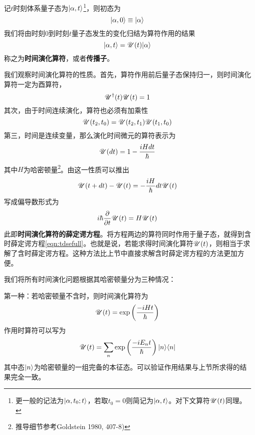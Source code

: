 记$ t $时刻体系量子态为$ |\alpha,t\rangle $\footnote{更一般的记法为$ |\alpha,t_0;t\rangle $，若取$ t_0=0 $则简记为$ |\alpha,t\rangle $。对下文算符$ \mathscr{U}(t) $同理。}，则初态为
\begin{equation}\label{key}
|\alpha,0\rangle\equiv|\alpha\rangle
\end{equation}
我们将由时刻0到时刻$ t $量子态发生的变化归结为算符作用的结果
\begin{equation}\label{key}
|\alpha,t\rangle=\mathscr{U}(t)|\alpha\rangle
\end{equation}
称之为\textbf{时间演化算符}，或者\textbf{传播子}。

我们观察时间演化算符的性质。首先，算符作用前后量子态保持归一，则时间演化算符一定为酉算符，
\begin{equation}\label{key}
\mathscr{U}^\dagger(t)\mathscr{U}(t)=1
\end{equation}
其次，由于时间连续演化，算符也必须有加乘性
\begin{equation}\label{key}
\mathscr{U}(t_2,t_0)=\mathscr{U}(t_2,t_1)\mathscr{U}(t_1,t_0)
\end{equation}
第三，时间是连续变量，那么演化时间微元的算符表示为
\begin{equation}\label{key}
\mathscr{U}(dt)=1-\dfrac{iHdt}{\hbar}
\end{equation}
其中$ H $为哈密顿量\footnote{推导细节参考Goldstein 1980, 407-8)}。由这一性质可以推出
\begin{equation}\label{key}
\mathscr{U}(t+dt)-\mathscr{U}(t)=-\dfrac{iH}{\hbar}dt\mathscr{U}(t)
\end{equation}
写成偏导数形式为
\begin{equation}\label{key}
i\hbar\dfrac{\partial}{\partial t}\mathscr{U}(t)=H\mathscr{U}(t)
\end{equation}
此即\textbf{时间演化算符的薛定谔方程}。将方程两边的算符同时作用于量子态，就得到含时薛定谔方程\eqref{eqn:tdsefull}。也就是说，若能求得时间演化算符$ \mathscr{U}(t) $，则相当于求解了含时薛定谔方程。这种方法比上节中直接求解含时薛定谔方程的方法更加方便。

我们将所有时间演化问题根据其哈密顿量分为三种情况：

第一种：若哈密顿量不含时，则时间演化算符为
\begin{equation}\label{key}
\mathscr{U}(t)=\exp\left(\dfrac{-iHt}{\hbar}\right)
\end{equation}
作用时算符可以写为
\begin{equation}\label{key}
\mathscr{U}(t)=\sum_n\exp\left(\dfrac{-iE_nt}{\hbar}\right)|n\rangle\langle n|
\end{equation}
其中态$ |n\rangle $为哈密顿量的一组完备的本征态。可以验证作用结果与上节所求得的结果完全一致。

